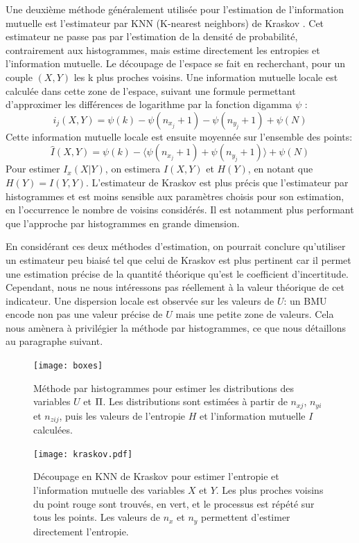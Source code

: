 \documentclass[../main]{subfiles}
\begin{document}
Une deuxième méthode généralement utilisée pour l'estimation de l'information mutuelle est l'estimateur par KNN (K-nearest neighbors) de Kraskov \cite{2004kraskov}. 
Cet estimateur ne passe pas par l'estimation de la densité de probabilité, contrairement aux histogrammes, mais estime directement les entropies et l'information mutuelle.
Le découpage de l'espace se fait en recherchant, pour un couple $(X,Y)$ les k plus proches voisins. Une information mutuelle locale est calculée dans cette zone de l'espace, suivant une formule permettant d'approximer les différences de logarithme par la fonction digamma $\psi$ : 
$$i_j(X,Y) = \psi(k) - \psi(n_{x_j} + 1) - \psi(n_{y_j} +1) + \psi(N)$$
Cette information mutuelle locale est ensuite moyennée sur l'ensemble des points: 
$$\hat{I}(X,Y) = \psi(k) - \langle\psi(n_{x_j} + 1) + \psi(n_{y_j} +1)\rangle + \psi(N)$$
Pour estimer $I_x(X|Y)$, on estimera $I(X,Y)$ et $H(Y)$, en notant que $H(Y) = I(Y,Y)$.
L'estimateur de Kraskov est plus précis que l'estimateur par histogrammes et est moins sensible aux paramètres choisis pour son estimation, en l'occurrence le nombre de voisins considérés. Il est notamment plus performant que l'approche par histogrammes en grande dimension.

En considérant ces deux méthodes d'estimation, on pourrait conclure qu'utiliser un estimateur peu biaisé tel que celui de Kraskov est plus pertinent car il permet une estimation précise de la quantité théorique qu'est le coefficient d'incertitude.
Cependant, nous ne nous intéressons pas réellement à la valeur théorique de cet indicateur. Une dispersion locale est observée sur les valeurs de $U$: un BMU encode non pas une valeur précise de $U$ mais une petite zone de valeurs. Cela nous amènera à privilégier la méthode par histogrammes, ce que nous détaillons au paragraphe suivant.

\begin{figure}
    \begin{minipage}{0.4\textwidth}
    \centering
    \texttt{[image: boxes]}
    \caption{Méthode par histogrammes pour estimer les distributions des variables $U$ et $\Pi$. Les distributions sont estimées à partir de $n_{xj}$, $n_{yi}$ et $n_{zij}$, puis les valeurs de l'entropie $H$ et l'information mutuelle $I$ calculées.}
    \label{fig:binning}  
    \end{minipage}
    \hfill
    \begin{minipage}{0.4\textwidth}    
            \centering
            \texttt{[image: kraskov.pdf]}
            \caption{Découpage en KNN de Kraskov pour estimer l'entropie et l'information mutuelle des variables $X$ et $Y$. Les plus proches voisins du point rouge sont trouvés, en vert, et le processus est répété sur tous les points. Les valeurs de $n_x$ et $n_y$ permettent d'estimer directement l'entropie.\label{fig:kraskov}}
            
    \end{minipage}
    \end{figure}
\end{document}
